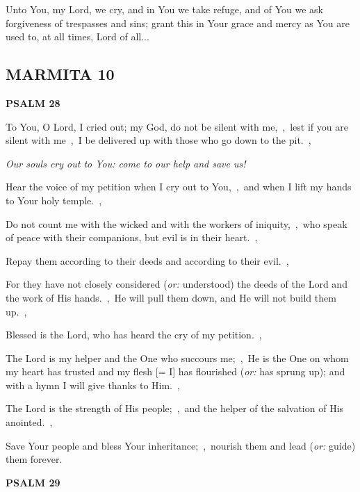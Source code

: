 \documentclass[12pt,twoside,a5paper]{article}
\newcommand{\marmita}[1]{\subsection*{MARMITA {#1}}}
\newcommand{\psalm}[1]{\textbf{PSALM {#1}}\nopagebreak}
\newcommand{\qanona}[1]{{\liturgicalhint{Qanona.} \emph{#1}}}
\newcommand{\slota}[1]{\liturgicalhint{Slota.} #1}
\newcommand{\translationoption}[1]{\emph{or:} #1}
\begin{document}
\slota{Unto You, my Lord, we cry, and in You we take refuge, and of You we ask forgiveness of trespasses and sins; grant this in Your grace and mercy as You are used to, at all times, Lord of all...}

\marmita{10}

\psalm{28}

\begin{normalparskip}
  To You, O Lord, I cried out; my God, do not be silent with me,~\sep\ lest if you are silent with me~\sep\ I be delivered up with those who go down to the pit.~\sep

  \qanona{Our souls cry out to You: come to our help and save us!}

  Hear the voice of my petition when I cry out to You,~\sep\ and when I lift my hands to Your holy temple.~\sep

  Do not count me with the wicked and with the workers of iniquity,~\sep\ who speak of peace with their companions, but evil is in their heart.~\sep

  Repay them according to their deeds and according to their evil.~\sep

  For they have not closely considered (\translationoption{understood}) the deeds of the Lord and the work of His hands.~\sep\ He will pull them down, and He will not build them up.~\sep

  Blessed is the Lord, who has heard the cry of my petition.~\sep

  The Lord is my helper and the One who succours me;~\sep\ He is the One on whom my heart has trusted and my flesh [= I] has flourished (\translationoption{has sprung up}); and with a hymn I will give thanks to Him.~\sep

  The Lord is the strength of His people;~\sep\ and the helper of the salvation of His anointed.~\sep

  Save Your people and bless Your inheritance;~\sep\ nourish them and lead (\translationoption{guide}) them forever.
\end{normalparskip}

\psalm{29}
\end{document}
